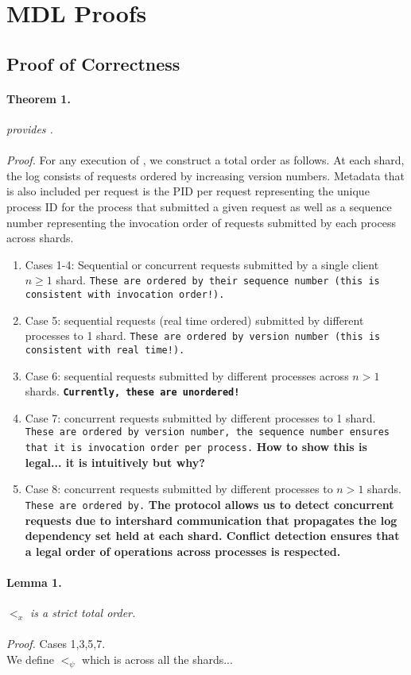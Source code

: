 \newpage

\section{MDL Proofs}
\label{sec:proofs}

\subsection{Proof of Correctness}

\paragraph{Theorem 1.} \textit{\protocol provides \mdl.}
\\
\\
\textit{Proof.} For any execution of \protocol, we construct a total order as follows. At each shard, the log consists of requests ordered by increasing version numbers. Metadata that is also included per request is the PID per request representing the unique process ID for the process that submitted a given request as well as a sequence number representing the invocation order of requests submitted by each process across shards. 
\begin{enumerate}
    \item Cases 1-4: Sequential or concurrent requests submitted by a single client $n \geq 1$ shard. \texttt{These are ordered by their sequence number (this is consistent with invocation order!).} 
    \item Case 5: sequential requests (real time ordered) submitted by different processes to 1 shard. \texttt{These are ordered by version number (this is consistent with real time!).}
    \item Case 6: sequential requests submitted by different processes across $n > 1$ shards. \textbf{\texttt{Currently, these are unordered!}}
    \item Case 7: concurrent requests submitted by different processes to 1 shard. \texttt{These are ordered by version number, the sequence number ensures that it is invocation order per process.} \textbf{How to show this is legal... it is intuitively but why?}
    \item Case 8: concurrent requests submitted by different processes to $n>1$ shards. \texttt{These are ordered by.} \textbf{The protocol allows us to detect concurrent requests due to intershard communication that propagates the log dependency set held at each shard. Conflict detection ensures that a legal order of operations across processes is respected.}
\end{enumerate}

\paragraph{Lemma 1.} \textit{$<_x$ is a strict total order.}
\\
\\
\textit{Proof.} Cases 1,3,5,7.
\\

We define $<_\psi$ which is across all the shards...